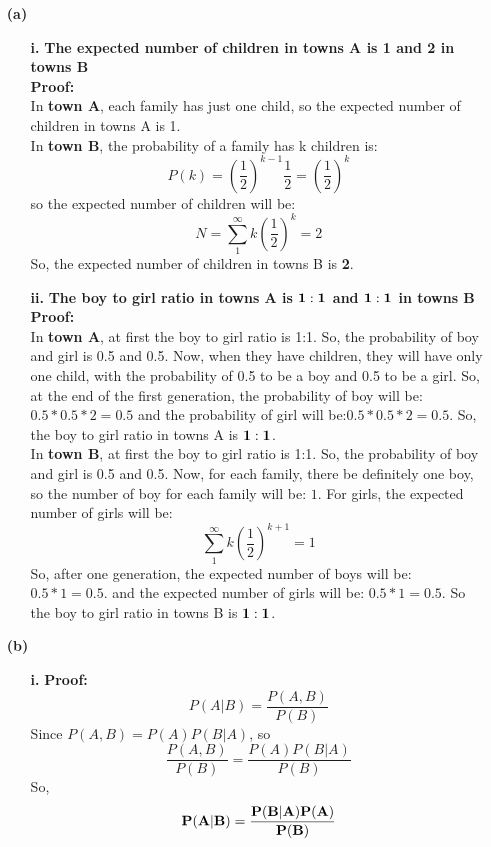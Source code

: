 \begin{enumerate}
\begin{enumerate}
\item[{\bf (a)}]
\begin{enumerate}
\item[{\bf i. }]
{\bf The expected number of children in towns A is 1 and 2 in towns B}\\

{\bf Proof:}\\
In {\bf town A}, each family has just one child, so the expected number of children in towns A is 1.\\

In {\bf town B}, the probability of a family has k children is: $$P(k) =(\frac{1}{2})^{k-1}\frac{1}{2} = (\frac{1}{2})^{k}$$
so the expected number of children will be: 
$$N = \sum_{1}^{\infty}k(\frac{1}{2})^{k} = 2$$
So, the expected number of children in towns B is {\bf 2}.\\

\item[{\bf ii. }]
{\bf The boy to girl ratio in towns A is ${\bf 1:1}$ and ${\bf 1:1}$ in towns B}\\

{\bf Proof:}\\
In {\bf town A}, at first the boy to girl ratio is 1:1. So, the probability of boy and girl is 0.5 and 0.5. Now, when they have children, they will have only one child, with the probability of 0.5 to be a boy and 0.5 to be a girl. So, at the end of the first generation, the probability of boy will be:$0.5*0.5*2 = 0.5$ and the probability of girl will be:$0.5*0.5*2 = 0.5$. So, the boy to girl ratio in towns A is ${\bf 1:1}$.\\

In {\bf town B}, at first the boy to girl ratio is 1:1. So, the probability of boy and girl is 0.5 and 0.5. Now, for each family, there be definitely one boy, so the number of boy for each family will be: $1$. For girls, the expected number of girls will be: $$\sum_{1}^{\infty}k(\frac{1}{2})^{k+1} = 1$$
So, after one generation, the expected number of boys will be: $0.5*1=0.5$. and the expected number of girls will be: $0.5*1=0.5$. So the boy to girl ratio in towns B is ${\bf 1:1}$.\\
\end{enumerate}

\item[{\bf (b)}]
\begin{enumerate}
\item[{\bf i. }]
{\bf Proof:}\\
$$P(A|B) = \frac{P(A, B)}{P(B)}$$
Since $P(A, B) = P(A)P(B|A)$, so $$\frac{P(A, B)}{P(B)} = \frac{P(A)P(B|A)}{P(B)}$$
So, $${\bf P(A|B) = \frac{P(B|A)P(A)}{P(B)}}$$\\


\end{enumerate}
\end{enumerate}
\end{enumerate}
